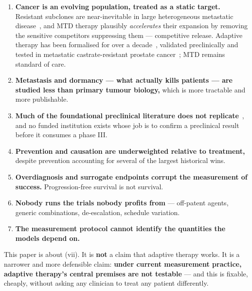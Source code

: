 \documentclass[11pt,a4paper]{article}
\begin{document}
\begin{enumerate}[label=(\roman*),leftmargin=2.2em,itemsep=0.35em]
\item \textbf{Cancer is an evolving population, treated as a static target.}
Resistant subclones are near-inevitable in large heterogeneous metastatic
disease~\citep{gerlinger2012intratumor}, and MTD therapy plausibly
\emph{accelerates} their expansion by removing the sensitive competitors
suppressing them --- competitive release. Adaptive therapy has been formalised for
over a decade~\citep{gatenby2009adaptive}, validated preclinically
\citep{enriquez2016exploiting} and tested in metastatic castrate-resistant prostate
cancer~\citep{zhang2017integrating}; MTD remains standard of care.

\item \textbf{Metastasis and dormancy --- what actually kills patients --- are
studied less than primary tumour biology,} which is more tractable and more
publishable.

\item \textbf{Much of the foundational preclinical literature does not
replicate}~\citep{errington2021investigating,errington2021challenges,begley2012raise,prinz2011believe},
and no funded institution exists whose job is to confirm a preclinical result
before it consumes a phase III.

\item \textbf{Prevention and causation are underweighted relative to treatment,}
despite prevention accounting for several of the largest historical wins.

\item \textbf{Overdiagnosis and surrogate endpoints corrupt the measurement of
success.} Progression-free survival is not survival.

\item \textbf{Nobody runs the trials nobody profits from} --- off-patent agents,
generic combinations, de-escalation, schedule variation.

\item \textbf{The measurement protocol cannot identify the quantities the models
depend on.}
\end{enumerate}

This paper is about (vii). It is \textbf{not} a claim that adaptive therapy works.
It is a narrower and more defensible claim: \textbf{under current measurement
practice, adaptive therapy's central premises are not testable} --- and this is
fixable, cheaply, without asking any clinician to treat any patient differently.
\end{document}
